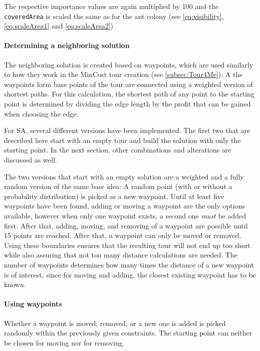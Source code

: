 The respective importance values are again multiplied by 100 and the  \texttt{coveredArea} is scaled the same as for the ant colony (see \ref{eq:visibility}, \ref{eq:scaleArea1} and \ref{eq:scaleArea2})

\paragraph{Determining a neighboring solution}

The neighboring solution is created based on waypoints, which are used similarly to how they work in the MinCost tour creation (see \ref{subsec:Tour4Me}):
A the waypoints form base points of the tour are connected using a weighted version of shortest paths. 
For this calculation, the shortest path of any point to the starting point is determined by dividing the edge length by the profit that can be gained when choosing the edge. 

For SA, several different versions have been implemented.
The first two that are described here start with an empty tour and build the solution with only the starting point.
In the next section, other combinations and alterations are discussed as well.

The two versions that start with an empty solution are a weighted and a fully random version of the same base idea:
A random point (with or without a probability distribution) is picked as a new waypoint. 
Until at least five waypoints have been found, adding or moving a waypoint are the only options available, however when only one waypoint exists, a second one \textit{must} be added first.
After that, adding, moving, and removing of a waypoint are possible until 15 points are reached.
After that, a waypoint can only be moved or removed.
Using these boundaries ensures that the resulting tour will not end up too short while also assuring that not too many distance calculations are needed.
The number of waypoints determines how many times the distance of a new waypoint is of interest, since for moving and adding, the closest existing waypoint has to be known.

\paragraph{Using waypoints}

Whether a waypoint is moved, removed, or a new one is added is picked randomly within the previously given constraints.
The starting point can neither be chosen for moving nor for removing.

